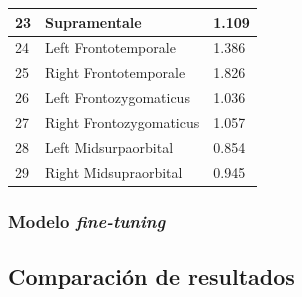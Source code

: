 \begin{table}[!ht]
\begin{tabular}{|l|l|l|}
                    23 & Supramentale & 1.109 \\ \hline
                    24 & Left Frontotemporale & 1.386 \\ \hline
                    25 & Right Frontotemporale & 1.826 \\ \hline
                    26 & Left Frontozygomaticus & 1.036 \\ \hline
                    27 & Right Frontozygomaticus & 1.057 \\ \hline
                    28 & Left Midsurpaorbital & 0.854 \\ \hline
                    29 & Right Midsupraorbital & 0.945 \\ \hline
                \end{tabular}
                \label{table:Daugmentation_landmarksresume}
            \end{table}


        \subsubsection{Modelo \textit{fine-tuning}}
    \subsection{Comparación de resultados}
\endinput



